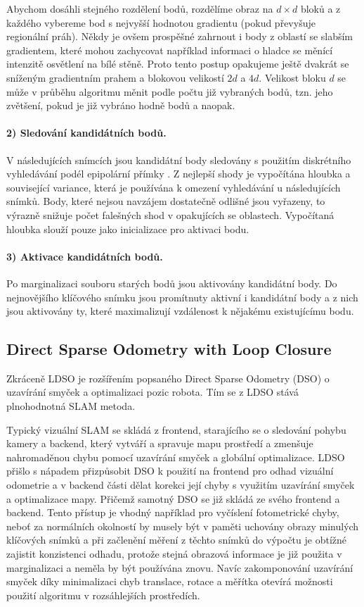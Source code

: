 \documentclass[12pt,a4paper]{article}
\begin{document}
Abychom dosáhli stejného rozdělení bodů, rozdělíme obraz na \( d \times d \) bloků a z každého vybereme bod s nejvyšší hodnotou gradientu (pokud převyšuje regionální práh). Někdy je ovšem prospěšné zahrnout i body z oblastí se slabším gradientem, které mohou zachycovat například informaci o hladce se měnící intenzitě osvětlení na bílé stěně. Proto tento postup opakujeme ještě dvakrát se sníženým gradientním prahem a blokovou velikostí \( 2d \) a \( 4d \). Velikost bloku \( d \) se může v průběhu algoritmu měnit podle počtu již vybraných bodů, tzn. jeho zvětšení, pokud je již vybráno hodně bodů a naopak.

\paragraph*{2) Sledování kandidátních bodů.} V následujících snímcích jsou kandidátní body sledovány s použitím diskrétního vyhledávání podél epipolární přímky \cite{Engel2018_DSO}. Z nejlepší shody je vypočítána hloubka a související variance, která je používána k omezení vyhledávání u následujících snímků. Body, které nejsou navzájem dostatečně odlišné jsou vyřazeny, to výrazně snižuje počet falešných shod v opakujících se oblastech. Vypočítaná hloubka slouží pouze jako inicializace pro aktivaci bodu.

\paragraph*{3) Aktivace kandidátních bodů.} Po marginalizaci souboru starých bodů jsou aktivovány kandidátní body. Do nejnovějšího klíčového snímku jsou promítnuty aktivní i kandidátní body a z nich jsou aktivovány ty, které maximalizují vzdálenost k nějakému existujícímu bodu.

\subsection{Direct Sparse Odometry with Loop Closure}
Zkráceně LDSO je rozšířením popsaného Direct Sparse Odometry (DSO) o uzavírání smyček a optimalizaci pozic robota. Tím se z LDSO stává plnohodnotná SLAM metoda.

Typický vizuální SLAM se skládá z frontend, starajícího se o sledování pohybu kamery a backend, který vytváří a spravuje mapu prostředí a zmenšuje nahromaděnou chybu pomocí uzavírání smyček a globální optimalizace. LDSO přišlo s nápadem přizpůsobit DSO k použití na frontend pro odhad vizuální odometrie a v backend části dělat korekci její chyby s využitím uzavírání smyček a optimalizace mapy. Přičemž samotný DSO se již skládá ze svého frontend a backend. Tento přístup je vhodný například pro vyčíslení fotometrické chyby, neboť za normálních okolností by musely být v paměti uchovány obrazy minulých klíčových snímků a při začlenění měření z těchto snímků do výpočtu je obtížné zajistit konzistenci odhadu, protože stejná obrazová informace je již použita v marginalizaci a neměla by být používána znovu. Navíc zakomponování uzavírání smyček díky minimalizaci chyb translace, rotace a měřítka otevírá možnosti použití algoritmu v rozsáhlejších prostředích.
\end{document}
